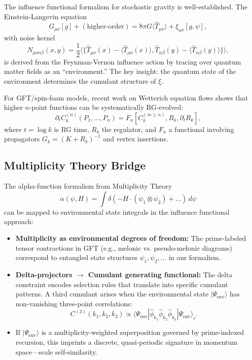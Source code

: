 \documentclass[12pt,a4paper]{article}
\begin{document}
The influence functional formalism for stochastic gravity is well-established. The Einstein-Langevin equation
\begin{equation}
G_{\mu\nu}[g] + (\text{higher-order}) = 8\pi G \langle \hat{T}_{\mu\nu} \rangle + \xi_{\mu\nu}[g, \psi],
\end{equation}
with noise kernel
\begin{equation}
N_{\mu\nu\alpha\beta}(x, y) = \frac{1}{2} \langle \{\hat{T}_{\mu\nu}(x) - \langle \hat{T}_{\mu\nu}(x) \rangle, \hat{T}_{\alpha\beta}(y) - \langle \hat{T}_{\alpha\beta}(y) \rangle\} \rangle,
\end{equation}
is derived from the Feynman-Vernon influence action by tracing over quantum matter fields as an ``environment.'' The key insight: the quantum state of the environment determines the cumulant structure of \(\xi\).

For GFT/spin-foam models, recent work on Wetterich equation flows shows that higher \(n\)-point functions can be systematically RG-evolved:
\begin{equation}
\partial_t C_k^{(n)}(P_1, \ldots, P_n) = F_n[C_k^{(m \leq n)}, R_k, \partial_t R_k],
\end{equation}
where \(t = \log k\) is RG time, \(R_k\) the regulator, and \(F_n\) a functional involving propagators \(G_k = (K + R_k)^{-1}\) and vertex insertions.

\subsection{Multiplicity Theory Bridge}

The alpha-function formalism from Multiplicity Theory
\begin{equation}
\alpha(\psi, H) = \int \delta(-H \cdot (\psi_1 \otimes \psi_2) + \ldots) \, d\psi
\end{equation}
can be mapped to environmental state integrals in the influence functional approach:

\begin{itemize}
\item \textbf{Multiplicity as environmental degrees of freedom:} The prime-labeled tensor contractions in GFT (e.g., melonic vs. pseudo-melonic diagrams) correspond to entangled state structures \(\psi_1, \psi_2, \ldots\) in our formalism.

\item \textbf{Delta-projectors \(\rightarrow\) Cumulant generating functional:} The delta constraint encodes selection rules that translate into specific cumulant patterns. A third cumulant arises when the environmental state \(|\Psi_{\text{env}}\rangle\) has non-vanishing three-point correlations:
\begin{equation}
C^{(3)}(k_1, k_2, k_3) \propto \langle \Psi_{\text{env}} | \hat{\phi}_{k_1} \hat{\phi}_{k_2} \hat{\phi}_{k_3} | \Psi_{\text{env}} \rangle_c.
\end{equation}

\item If \(|\Psi_{\text{env}}\rangle\) is a multiplicity-weighted superposition governed by prime-indexed recursion, this imprints a discrete, quasi-periodic signature in momentum space—scale self-similarity.
\end{itemize}
\end{document}
